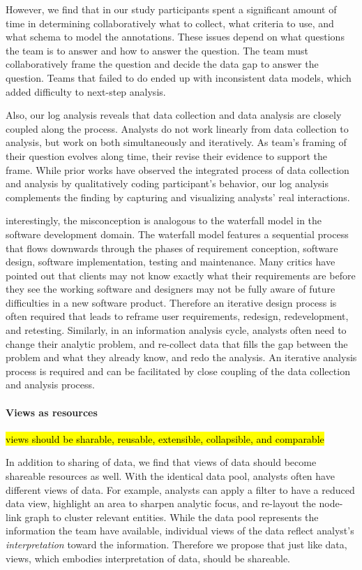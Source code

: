 However, we find that in our study participants spent a significant amount of time in determining collaboratively what to collect, what criteria to use, and what schema to model the annotations. These issues depend on what questions the team is to answer and how to answer the question. The team must collaboratively frame the question and decide the data gap to answer the question. Teams that failed to do ended up with inconsistent data models, which added difficulty to next-step analysis. 

Also, our log analysis reveals that data collection and data analysis are closely coupled along the process. Analysts do not work linearly from data collection to analysis, but work on both simultaneously and iteratively. As team's framing of their question evolves along time, their revise their evidence to support the frame. While prior works have observed the integrated process of data collection and analysis by qualitatively coding participant's behavior, our log analysis complements the finding by capturing and visualizing analysts' real interactions. 

interestingly, the misconception is analogous to the waterfall model in the software development domain. The waterfall model features a sequential process that flows downwards through the phases of requirement conception, software design, software implementation, testing and maintenance. Many critics have pointed out that clients may not know exactly what their requirements are before they see the working software and designers may not be fully aware of future difficulties in a new software product. Therefore an iterative design process is often required that leads to reframe user requirements, redesign, redevelopment, and retesting. Similarly, in an information analysis cycle, analysts often need to change their analytic problem, and re-collect data that fills the gap between the problem and what they already know, and redo the analysis. An iterative analysis process is required and can be facilitated by close coupling of the data collection and analysis process. 

\paragraph{Views as resources}

\hl{views should be sharable, reusable, extensible, collapsible, and comparable}

In addition to sharing of data, we find that views of data should become shareable resources as well. With the identical data pool, analysts often have different views of data. For example, analysts can apply a filter to have a reduced data view, highlight an area to sharpen analytic focus, and re-layout the node-link graph to cluster relevant entities. While the data pool represents the information the team have available, individual views of the data reflect analyst's \emph{interpretation} toward the information. Therefore we propose that just like data, views, which embodies interpretation of data, should be shareable. 

